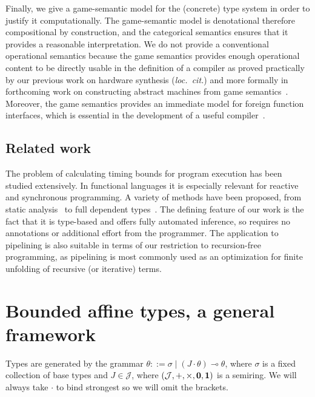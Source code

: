 \documentclass{article}
\newcommand{\ringunit}{\textbf 1}
\newcommand{\ringzero}{\textbf 0}
\begin{document}
Finally, we give a game-semantic model for the (concrete) type system in order to justify it computationally. The game-semantic model is denotational therefore compositional by construction, and the categorical semantics ensures that it provides a reasonable interpretation. We do not provide a conventional operational semantics because the game semantics provides enough operational content to be directly usable in the definition of a compiler as proved practically by our previous work on hardware synthesis (\emph{loc.\ cit.}) and more formally in forthcoming work on constructing abstract machines from game semantics~\cite{fredrikssong13}. Moreover, the game semantics   provides an immediate model for foreign function interfaces, which is essential in the development of a useful compiler~\cite{DBLP:conf/memocode/Ghica11}.

\subsection{Related work}

The problem of calculating timing bounds for program execution has been studied extensively. In functional languages it is especially relevant for reactive~\cite{wan2001real} and syn\-chronous \cite{pilaud1987lustre} programming. A variety of methods have been proposed, from static analysis~\cite{liu1998automatic} to full dependent types~\cite{Crary:2000:RBC:325694.325716}. The defining feature of our work is the fact that it is type-based and offers fully automated inference, so requires no annotations or additional effort from the programmer. The application to pipelining is also suitable in terms of our restriction to recursion-free programming, as pipelining is most commonly used as an optimization for finite unfolding of recursive (or iterative) terms. 

\section{Bounded affine types, a general framework}\label{sub:agf}
 Types are generated by the grammar $\theta::=\sigma\mid (J\cdot\theta)\multimap\theta$, where $\sigma$ is a fixed collection of base types and $J\in\mathcal J$, where $(\mathcal J,+,\times,\ringzero,\ringunit)$ is a semiring. We will always take $\cdot$ to bind strongest so we will omit the brackets. 
\end{document}
